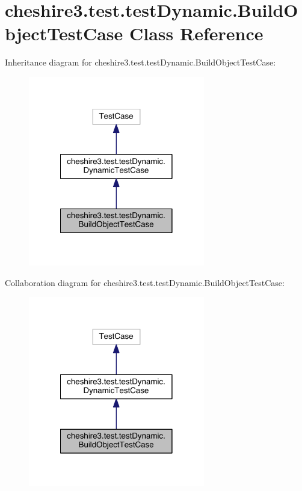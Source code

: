 \hypertarget{classcheshire3_1_1test_1_1test_dynamic_1_1_build_object_test_case}{\section{cheshire3.\-test.\-test\-Dynamic.\-Build\-Object\-Test\-Case Class Reference}
\label{classcheshire3_1_1test_1_1test_dynamic_1_1_build_object_test_case}
}


Inheritance diagram for cheshire3.\-test.\-test\-Dynamic.\-Build\-Object\-Test\-Case\-:
\nopagebreak
\begin{figure}[H]
\begin{center}
\leavevmode
\includegraphics[width=218pt]{classcheshire3_1_1test_1_1test_dynamic_1_1_build_object_test_case__inherit__graph}
\end{center}
\end{figure}


Collaboration diagram for cheshire3.\-test.\-test\-Dynamic.\-Build\-Object\-Test\-Case\-:
\nopagebreak
\begin{figure}[H]
\begin{center}
\leavevmode
\includegraphics[width=218pt]{classcheshire3_1_1test_1_1test_dynamic_1_1_build_object_test_case__coll__graph}
\end{center}
\end{figure}
